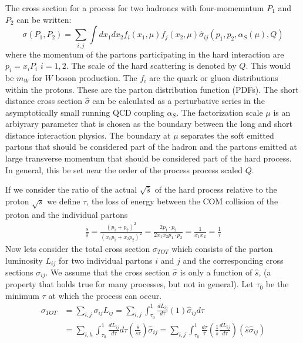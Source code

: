 The cross section for a process for two hadroncs with four-momemntum $P_1$ and $P_2$ can be written:
\begin{equation}
\sigma(P_1, P_2) = \sum_{i,j} \int dx_1 dx_2 f_i(x_1,\mu) f_j(x_2, \mu) \hat{\sigma}_{ij}(p_1, p_2, \alpha_S(\mu), Q)  
\end{equation}
where the momentum of the partons participating in the hard interaction are $p_i=x_i P_i$ $i=1,2$. The scale of the
hard scattering is denoted by $Q$. This would be $m_W$ for $W$ boson production. The $f_i$ are the quark or gluon distributions within the protons. These are the parton distribution function (PDFs). The short distance
cross section $\hat \sigma$ can be calculated as a perturbative series in the asymptotically small running QCD coupling 
$\alpha_S$. The factorization scale $\mu$ is an arbiyrary parameter that is chosen as the boundary between the long
and short distance interaction physics. The boundary at $\mu$ separates the soft emitted partons that should be
considered part of the hadron and the partons emitted at large transverse momentum that should be considered part 
of the hard process. In general, this be set near the order of the process process scaled $Q$. 

If we consider the ratio of the actual $\sqrt{\hat s}$ of the hard process relative to the proton $\sqrt{s}$ we define $\tau$,
the loss of energy between the COM collision of the proton and the individual partons
\begin{align*}
\frac{s}{\hat s}=\frac{(p_1+p_2)^2}{(x_1p_1+x_2p_2)^2} = \frac{2p_1 \cdot p_2}{2x_1x_2 p_1 \cdot p_2} = \frac{1}{x_1x_2} = \frac{1}{\tau}
\end{align*}
Now lets consider the total cross section $\sigma_{TOT}$ which consists of the parton luminosity $L_{ij}$ for two individual
partons $i$ and $j$ and the corresponding cross sections $\sigma_{ij}$. We assume that the cross section $\hat{\sigma}$ is 
only a function of $\hat s$, (a property that holds true for many processes, but not in general). Let $\tau_0$ be the 
minimum $\tau$ at which the process can occur.
\begin{align*}
\sigma_{TOT} &= \sum_{i,j} \sigma_{ij} L_{ij} = \sum_{i,j} \int_{\tau_0}^1  \frac{dL_{ij}}{d\tau}(1)\hat{\sigma}_{ij}  d\tau \\ 
& = \sum_{i,h} \int_{\tau_0}^1 \frac{dL_{ij}}{d\tau} d\tau \left ( \frac{\hat s}{s \tau} \right) \hat{\sigma}_{ij} 
= \sum_{i,j} \int_{\tau_0}^1 \frac{d\tau}{\tau} \left (\frac{1}{s} \frac{dL_{ij}}{d\tau} \right) \left(\hat{s} \hat{\sigma}_{ij}  \right) 
\end{align*}

